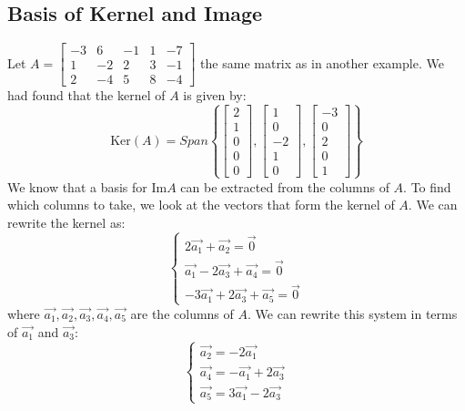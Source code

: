 \subsection{Basis of Kernel and Image}
\begin{eg}
    Let $A = \begin{bmatrix}
        -3 & 6 & -1 & 1 & -7 \\
        1 & -2 & 2 & 3 & -1 \\
        2 & -4 & 5 & 8 & -4
    \end{bmatrix}$ the same matrix as in another example. We had found that the kernel of $A$ is given by:
    \[ \text{Ker}(A) = Span\left\{ \begin{bmatrix}
        2 \\ 1 \\ 0 \\ 0 \\ 0
    \end{bmatrix}, \begin{bmatrix}
        1 \\ 0 \\ -2 \\ 1 \\ 0
    \end{bmatrix}, \begin{bmatrix}
        -3 \\ 0 \\ 2 \\ 0 \\ 1
    \end{bmatrix} \right\} \]
    We know that a basis for $\text{Im} A$ can be extracted from the columns of $A$. To find which columns to take, we look at the vectors that form the kernel of $A$. We can rewrite the kernel as:
    \[
        \begin{cases}
            2\vec{a_1} + \vec{a_2} = \vec{0} \\
            \vec{a_1} - 2\vec{a_3} + \vec{a_4} = \vec{0} \\
            -3\vec{a_1} + 2\vec{a_3} + \vec{a_5} = \vec{0}
        \end{cases}
    \]
    where $\vec{a_1}, \vec{a_2}, \vec{a_3}, \vec{a_4}, \vec{a_5}$ are the columns of $A$. We can rewrite this system in terms of $\vec{a_1}$ and $\vec{a_3}$:
    \[ \begin{cases}
        \vec{a_2} = -2\vec{a_1} \\
        \vec{a_4} = -\vec{a_1} + 2\vec{a_3} \\
        \vec{a_5} = 3\vec{a_1} - 2\vec{a_3}

\end{cases}\]
\end{eg}
